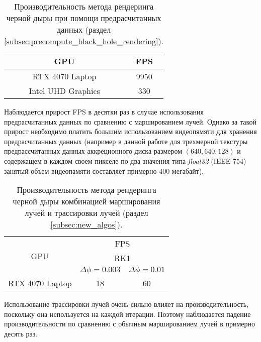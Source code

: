 \begin{center}
    \begin{table}[h!]
        \centering
        \begin{tabular}{|c|c|}
        \hline
        GPU                & FPS  \\ \hline
        RTX 4070 Laptop    & 9950 \\ \hline
        Intel UHD Graphics & 330  \\ \hline
        \end{tabular}
        \caption{Производительность метода рендеринга черной дыры при помощи предрасчитанных данных (раздел \ref{subsec:precompute_black_hole_rendering}).}
        \label{tab:results_precomputed}
    \end{table}
\end{center}

Наблюдается прирост FPS в десятки раз в случае использования предрасчитанных данных по сравнению с маршированием лучей. Однако за такой прирост необходимо платить большим использованием видеопямяти для хранения предрасчитанных данных (например в данной работе для трехмерной текстуры предрассчитанных данных аккреционного диска размером $(640, 640, 128)$ и содержащем в каждом своем пикселе по два значения типа \textit{float32} (IEEE-754) занятый объем видеопамяти составляет примерно 400 мегабайт).

\begin{center}
    \begin{table}[h!]
        \centering
        \begin{tabular}{|c|cc|}
        \hline
        \multirow{3}{*}{GPU} & \multicolumn{2}{c|}{FPS}                                        \\ \cline{2-3} 
                             & \multicolumn{2}{c|}{RK1}                                        \\ \cline{2-3} 
                             & \multicolumn{1}{c|}{$\Delta\phi = 0.003$} & $\Delta\phi = 0.01$ \\ \hline
        RTX 4070 Laptop      & \multicolumn{1}{c|}{18}                   & 60                  \\ \hline
        \end{tabular}
        \caption{Производительность метода рендеринга черной дыры комбинацией марширования лучей и трассировки лучей (раздел \ref{subsec:new_algos}).}
        \label{tab:results_raymarchingtracing}
    \end{table}
\end{center}

Использование трассировки лучей очень сильно влияет на производительность, поскольку она используется на каждой итерации. Поэтому наблюдается падение производительности по сравнению с обычным маршированием лучей в примерно десять раз.

\newpage